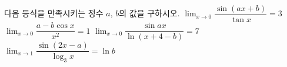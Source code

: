 다음 등식을 만족시키는 정수 $a$, $b$의 값을 구하시오.
 $\displaystyle\lim_{x\to 0}\dfrac{\sin(ax+b)}{\tan x}=3$
 $\displaystyle\lim_{x\to 0}\dfrac{a-b\cos x}{x^2}=1$
 $\displaystyle\lim_{x\to 0}\dfrac{\sin ax}{\ln(x+4-b)}=7$
 $\displaystyle\lim_{x\to 1}\dfrac{\sin(2x-a)}{\log_3 x}=\ln b$
